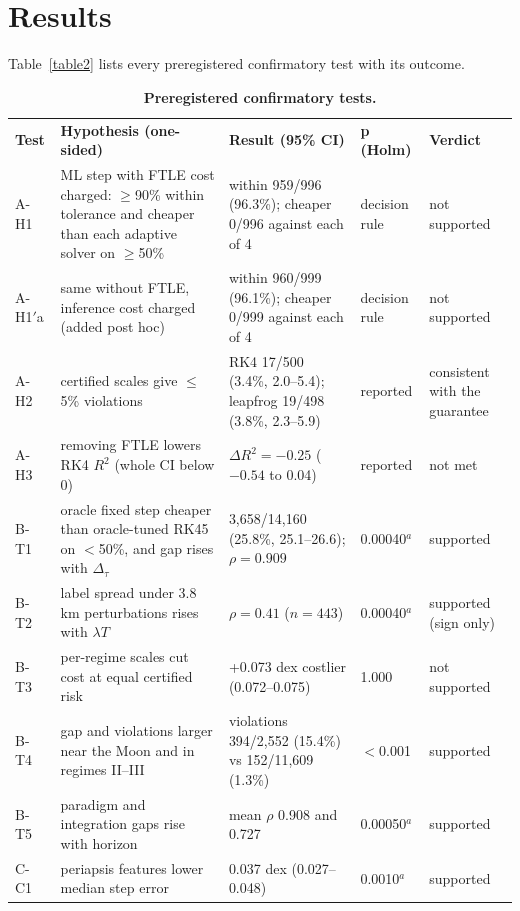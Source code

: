\documentclass[10pt,letterpaper]{article}
\newlength\savedwidth
\newcommand\thickhline{\noalign{\global\savedwidth\arrayrulewidth\global\arrayrulewidth 2pt}%
\hline
\noalign{\global\arrayrulewidth\savedwidth}}
\begin{document}
\section*{Results}
Table~\ref{table2} lists every preregistered confirmatory test with its outcome.

\begin{table}[!htbp]
\centering
\caption{{\bf Preregistered confirmatory tests.}}
\footnotesize
\begin{tabular}{|L{0.55in}|L{1.95in}|L{1.9in}|L{0.5in}|L{0.75in}|}
\hline
\textbf{Test} & \textbf{Hypothesis (one-sided)} & \textbf{Result (95\% CI)} & \textbf{p (Holm)} & \textbf{Verdict} \\ \thickhline
A-H1 & ML step with FTLE cost charged: $\ge$90\% within tolerance and cheaper than each adaptive solver on $\ge$50\% & within 959/996 (96.3\%); cheaper 0/996 against each of 4 & decision rule & not supported \\ \hline
A-H1$'$a & same without FTLE, inference cost charged (added post hoc) & within 960/999 (96.1\%); cheaper 0/999 against each of 4 & decision rule & not supported \\ \hline
A-H2 & certified scales give $\le$5\% violations & RK4 17/500 (3.4\%, 2.0--5.4); leapfrog 19/498 (3.8\%, 2.3--5.9) & reported & consistent with the guarantee \\ \hline
A-H3 & removing FTLE lowers RK4 $R^{2}$ (whole CI below 0) & $\Delta R^{2} = -0.25$ ($-0.54$ to 0.04) & reported & not met \\ \thickhline
B-T1 & oracle fixed step cheaper than oracle-tuned RK45 on $<$50\%, and gap rises with $\Delta_{\tau}$ & 3,658/14,160 (25.8\%, 25.1--26.6); $\rho = 0.909$ & 0.00040$^{a}$ & supported \\ \hline
B-T2 & label spread under 3.8 km perturbations rises with $\lambda T$ & $\rho = 0.41$ ($n = 443$) & 0.00040$^{a}$ & supported (sign only) \\ \hline
B-T3 & per-regime scales cut cost at equal certified risk & +0.073 dex costlier (0.072--0.075) & 1.000 & not supported \\ \hline
B-T4 & gap and violations larger near the Moon and in regimes II--III & violations 394/2,552 (15.4\%) vs 152/11,609 (1.3\%) & $<$0.001 & supported \\ \hline
B-T5 & paradigm and integration gaps rise with horizon & mean $\rho$ 0.908 and 0.727 & 0.00050$^{a}$ & supported \\ \thickhline
C-C1 & periapsis features lower median step error & 0.037 dex (0.027--0.048) & 0.0010$^{a}$ & supported \\ \hline

\end{tabular}
\end{table}
\end{document}

